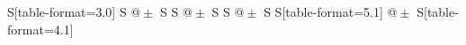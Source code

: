 \begin{table}[h]
\begin{tabular}{S[table-format=3.0] S @{${}\pm{}$} S S @{${}\pm{}$} S S @{${}\pm{}$} S S[table-format=5.1] @{${}\pm{}$} S[table-format=4.1]}
    \bottomrule
    \end{tabular}
  \end{table}

